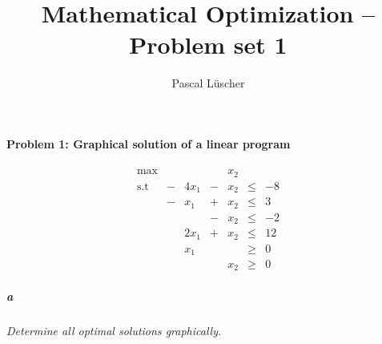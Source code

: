 \documentclass[12pt, a4]{article}
\author{Pascal Lüscher}
\title{Mathematical Optimization – Problem set 1}
\begin{document}
\paragraph{Problem 1: Graphical solution of a linear program}

\begin{equation*}
	\begin{array}{lcrcrcr}
		\text{max} &  &  &  & x_2 &  & \\
		\text{s.t} & - & 4x_1 & - & x_2 & \leq & -8\\
		& - & x_1 & + & x_2 & \leq & 3\\
		&&& - & x_2 & \leq & -2 \\
		&& 2 x_1 & + & x_2 & \leq & 12 \\
		&& x_1 &&&\geq&0\\
		&& &&x_2&\geq&0
	\end{array}
\end{equation*}

\newcommand{\lightgray}{black!30}
\newcommand{\addPlotLDown}[1]{
	\addplot[mark=none, domain=-1:8, color=\lightgray,
		decoration={border,segment length=1mm,amplitude=1.5mm,angle=-135},
		postaction={decorate}
	] {#1};
	\addplot[mark=none, domain=-1:8] {#1};
}
\newcommand{\addPlotRUp}[1]{
	\addplot[mark=none, domain=-1:8, color=\lightgray,
		decoration={border,segment length=1mm,amplitude=1.5mm,angle=135},
		postaction={decorate}
	] {#1};
	\addplot[mark=none, domain=-1:8] {#1};
}

\subparagraph{a}\label{pg:a} \textit{Determine all optimal solutions graphically.}
\begin{figure}[h]
	\centering
\end{figure}
\end{document}
